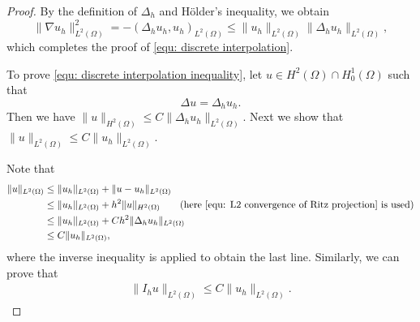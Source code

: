\documentclass{siamart250211}
\def\nn{\nonumber}
\begin{document}
\begin{proof}
By the definition of $\Delta_h$ and H\"older's inequality, we obtain
\begin{equation*}
 	\|\nabla u_h\|_{L^2(\Omega)}^2 = - (\Delta_h u_h, u_h)_{L^2(\Omega)} \le \|u_h\|_{L^2(\Omega)} \|\Delta_h u_h\|_{L^2(\Omega)},
 \end{equation*}
which completes the proof of \eqref{equ: discrete interpolation}.

To prove \eqref{equ: discrete interpolation inequality}, let $u \in H^2(\Omega) \cap H_0^1(\Omega)$ such that 
\begin{equation*}
	\Delta u = \Delta_h u_h.
\end{equation*}
Then we have $\|u\|_{H^2(\Omega)} \le C \|\Delta_h u_h \|_{L^2(\Omega)}$. Next we show that $\|u\|_{L^2(\Omega)} \le C \|u_h\|_{L^2(\Omega)}$.
	
Note that 
\begin{align}
	\|u\|_{L^2(\Omega)} & \le \|u_h\|_{L^2(\Omega)} + \|u - u_h\|_{L^2(\Omega)} \nn \\
	& \le  \|u_h\|_{L^2(\Omega)} + h^2 \|u\|_{H^2(\Omega)} \qquad (\text{here \eqref{equ: L2 convergence of Ritz projection} is used}) \nn \\
	& \le \|u_h\|_{L^2(\Omega)} + C h^2 \|\Delta_h u_h \|_{L^2(\Omega)} \nn \\
	& \le C \|u_h\|_{L^2(\Omega)}, \label{equ: 4.6}
\end{align}
where the inverse inequality is applied to obtain the last line. Similarly, we can prove that
\begin{align}\label{equ: 4.7}
\|I_hu\|_{L^2(\Omega)} \le C \|u_h\|_{L^2(\Omega)}.
\end{align}
	

\end{proof}
\end{document}
